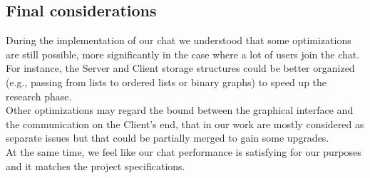 \documentclass[12pt]{article}
\begin{document}
\subsection*{Final considerations}
During the implementation of our chat we understood that some optimizations are still possible, more significantly in the case where a lot of users join the chat. For instance, the Server and Client storage structures could be better organized (e.g., passing from lists to ordered lists or binary graphs) to speed up the research phase. \\
Other optimizations may regard the bound between the graphical interface and the communication on the Client's end, that in our work are mostly considered as separate issues but that could be partially merged to gain some upgrades. \\
At the same time, we feel like our chat performance is satisfying for our purposes and it matches the project specifications.

\newpage
\nocite{*}
\printbibliography
\end{document}
